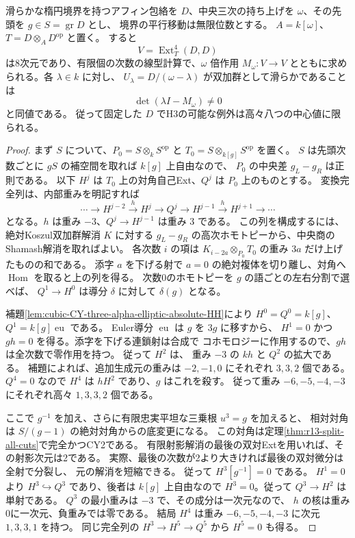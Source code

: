 \begin{theorem}\label{thm:cubic-CY-three-alpha-elliptic-diagonal-test}
滑らかな楕円境界を持つアフィン包絡を $D$、中央三次の持ち上げを
$\omega$、その先頭を $g\in S=\operatorname{gr}D$ とし、
境界の平行移動は無限位数とする。
$A=k[\omega]$、$T=D\otimes_A D^{\mathrm{op}}$ と置く。
すると
\[
 V=\operatorname{Ext}^4_T(D,D)
\]
は8次元であり、有限個の次数の線型計算で、$\omega$ 倍作用
$M_\omega\colon V\to V$ とともに求められる。各 $\lambda\in k$ に対し、
$U_\lambda=D/(\omega-\lambda)$ が双加群として滑らかであることは
\[
 \det(\lambda I-M_\omega)\ne0
\]
と同値である。
従って固定した $D$ でH3の可能な例外は高々八つの中心値に限られる。
\end{theorem}

\begin{proof}
まず $S$ について、$P_0=S\otimes_k S^{\mathrm{op}}$ と
$T_0=S\otimes_{k[g]}S^{\mathrm{op}}$ を置く。
$S$ は先頭次数ごとに $gS$ の補空間を取れば $k[g]$ 上自由なので、
$P_0$ の中央差 $g_L-g_R$ は正則である。
以下 $H^j$ は $T_0$ 上の対角自己Ext、$Q^j$ は $P_0$ 上のものとする。
変換完全列は、内部重みを明記すれば
\[
 \cdots\longrightarrow H^{j-2}\xrightarrow{\,h\,}H^j
 \longrightarrow Q^j\longrightarrow H^{j-1}
 \xrightarrow{\,h\,}H^{j+1}\longrightarrow\cdots
\]
となる。$h$ は重み $-3$、$Q^j\to H^{j-1}$ は重み $3$ である。
この列を構成するには、絶対Koszul双加群解消 $K$ に対する
$g_L-g_R$ の高次ホモトピーから、中央商のShamash解消を取ればよい。
各次数 $i$ の項は $K_{i-2a}\otimes_{P_0}T_0$ の重み $3a$
だけ上げたものの和である。
添字 $a$ を下げる射で $a=0$ の絶対複体を切り離し、対角へ
$\operatorname{Hom}$ を取ると上の列を得る。
次数0のホモトピーを $g$ の語ごとの左右分割で選べば、
$Q^1\to H^0$ は導分 $\delta$ に対して $\delta(g)$ となる。

補題\ref{lem:cubic-CY-three-alpha-elliptic-absolute-HH}により
$H^0=Q^0=k[g]$、$Q^1=k[g]\operatorname{eu}$ である。
Euler導分 $\operatorname{eu}$ は $g$ を $3g$ に移すから、
$H^1=0$ かつ $gh=0$ を得る。添字を下げる連鎖射は合成で
コホモロジーに作用するので、$gh$ は全次数で零作用を持つ。
従って $H^2$ は、
重み $-3$ の $kh$ と $Q^2$ の拡大である。
補題によれば、追加生成元の重みは $-2,-1,0$ にそれぞれ $3,3,2$ 個である。
$Q^4=0$ なので $H^4$ は $hH^2$ であり、$g$ はこれを殺す。
従って重み $-6,-5,-4,-3$ にそれぞれ高々 $1,3,3,2$ 個である。

ここで $g^{-1}$ を加え、さらに有限忠実平坦な三乗根 $u^3=g$ を加えると、
相対対角は $S/(g-1)$ の絶対対角からの底変更になる。
この対角は定理\ref{thm:r13-split-all-cuts}で完全かつCY2である。
有限射影解消の最後の双対Extを用いれば、その射影次元は2である。
実際、最後の次数が2より大きければ最後の双対微分は全射で分裂し、
元の解消を短縮できる。
従って $H^3[g^{-1}]=0$ である。
$H^1=0$ より $H^3\hookrightarrow Q^3$ であり、後者は $k[g]$ 上自由なので
$H^3=0$。従って $Q^3\to H^2$ は単射である。
$Q^3$ の最小重みは $-3$ で、その成分は一次元なので、
$h$ の核は重み0に一次元、負重みでは零である。
結局 $H^4$ は重み $-6,-5,-4,-3$ に次元 $1,3,3,1$ を持つ。
同じ完全列の $H^3\to H^5\to Q^5$ から $H^5=0$ も得る。


\end{proof}
